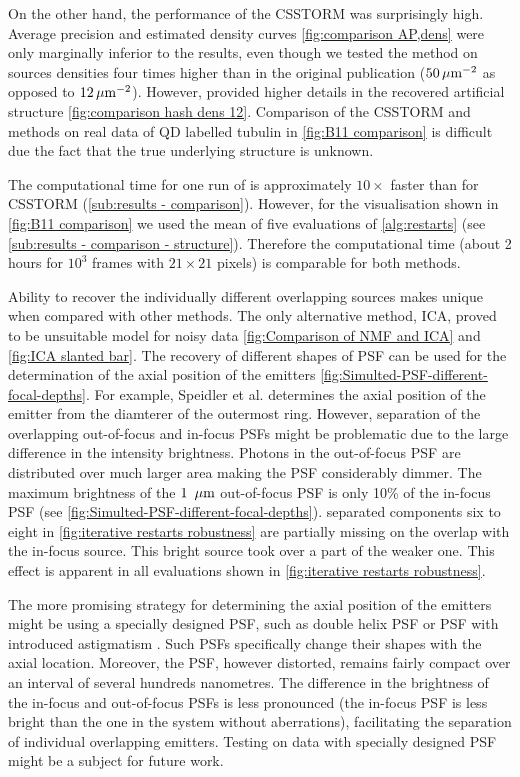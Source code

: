 On the other hand, the performance of the CSSTORM was surprisingly high. Average precision and estimated density curves \autoref{fig:comparison AP,dens} were only marginally inferior to the \inmf{} results, even though we tested the method on sources densities four times higher than in the original publication \cite{Zhu2012} ($50 \, \mathrm{\mu m}^{-2}$ as opposed to $12 \, \mathrm{\mu m}^{-2}$). However, \inmf{} provided higher details in the recovered artificial structure \autoref{fig:comparison hash dens 12}. Comparison of the CSSTORM and \inmf{} methods on real data of QD labelled tubulin in \autoref{fig:B11 comparison} is difficult due the fact that the true underlying structure is unknown. 

The computational time for one run of \inmf{} is approximately $10\times$ faster than for CSSTORM (\autoref{sub:results - comparison}). However, for the visualisation shown in \autoref{fig:B11 comparison} we used the mean of five evaluations of \autoref{alg:restarts} (see \autoref{sub:results - comparison - structure}). Therefore the computational time (about 2 hours for  $10^{3}$ frames with $21 \times 21$ pixels) is comparable for both methods. 

Ability to recover the individually different overlapping sources makes \inmf{} unique when compared with other methods. The only alternative method, ICA, proved to be unsuitable model for noisy data \autoref{fig:Comparison of NMF and ICA} and \ref{fig:ICA slanted bar}. The recovery of different shapes of PSF can be used for the determination of the axial position of the emitters \autoref{fig:Simulted-PSF-different-focal-depths}. For example, Speidler et al. \cite{Speidel2003} determines the axial position of the emitter from the diamterer of the outermost ring. However, separation of the overlapping out-of-focus and in-focus PSFs might be problematic due to the large difference in the intensity brightness. Photons in the out-of-focus PSF are distributed over much larger area making the PSF considerably dimmer. The maximum brightness of the $1\ \, \mathrm{\mu m}$ out-of-focus PSF is only 10\% of the in-focus PSF (see \autoref{fig:Simulted-PSF-different-focal-depths}). \inmf{} separated components six to eight in \autoref{fig:iterative restarts robustness} are partially missing on the overlap with the in-focus source. This bright source took over a part of the weaker one. This effect is apparent in all evaluations shown in \autoref{fig:iterative restarts robustness}.

The more promising strategy for determining the axial position of the emitters might be using a specially designed PSF, such as double helix PSF \cite{Quirin2011} or PSF with introduced astigmatism \cite{Huang2008}. Such PSFs specifically change their shapes with the axial location. Moreover, the PSF, however distorted, remains fairly compact over an interval of several hundreds nanometres. The difference in the brightness of the in-focus and out-of-focus PSFs is less pronounced (the in-focus PSF is less bright than the one in the system without aberrations), facilitating the separation of individual overlapping emitters. Testing \inmf{} on data with specially designed PSF \cite{Huang2008,Quirin2011} might be a subject for future work. 

